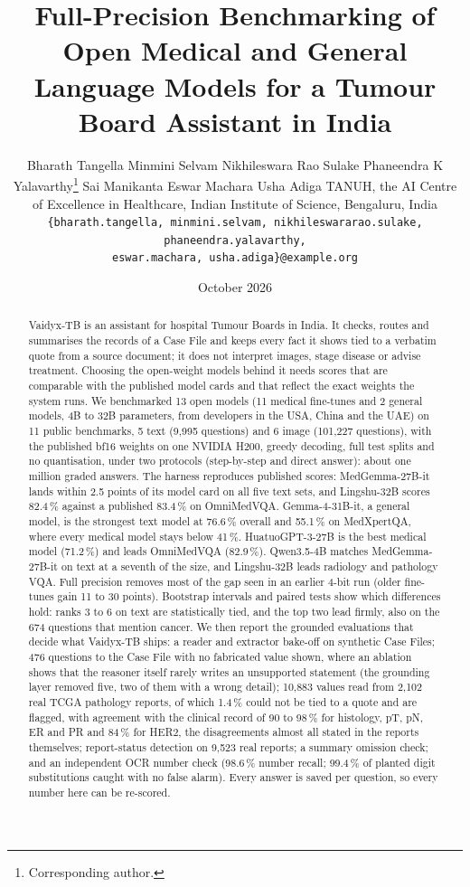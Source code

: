 \documentclass{article}
\title{Full-Precision Benchmarking of Open Medical and General Language Models for a Tumour Board Assistant in India}
\author{%
  Bharath Tangella \And Minmini Selvam \And Nikhileswara Rao Sulake
  \AND Phaneendra K Yalavarthy\thanks{Corresponding author.} \And Sai Manikanta Eswar Machara \And Usha Adiga
  \AND \normalfont TANUH, the AI Centre of Excellence in Healthcare, Indian Institute of Science, Bengaluru, India\\
  \texttt{\{bharath.tangella, minmini.selvam, nikhileswararao.sulake, phaneendra.yalavarthy,}\\
  \texttt{eswar.machara, usha.adiga\}@example.org}
}
\date{October 2026}
\newcommand{\pct}{\,\%}
\begin{document}
\maketitle

\begin{abstract}
Vaidyx-TB is an assistant for hospital Tumour Boards in India. It checks, routes and summarises the records of a Case File and keeps every fact it shows tied to a verbatim quote from a source document; it does not interpret images, stage disease or advise treatment. Choosing the open-weight models behind it needs scores that are comparable with the published model cards and that reflect the exact weights the system runs. We benchmarked 13 open models (11 medical fine-tunes and 2 general models, 4B to 32B parameters, from developers in the USA, China and the UAE) on 11 public benchmarks, 5 text (9,995 questions) and 6 image (101,227 questions), with the published bf16 weights on one NVIDIA H200, greedy decoding, full test splits and no quantisation, under two protocols (step-by-step and direct answer): about one million graded answers. The harness reproduces published scores: MedGemma-27B-it lands within 2.5 points of its model card on all five text sets, and Lingshu-32B scores 82.4\pct{} against a published 83.4\pct{} on OmniMedVQA. Gemma-4-31B-it, a general model, is the strongest text model at 76.6\pct{} overall and 55.1\pct{} on MedXpertQA, where every medical model stays below 41\pct{}. HuatuoGPT-3-27B is the best medical model (71.2\pct{}) and leads OmniMedVQA (82.9\pct{}). Qwen3.5-4B matches MedGemma-27B-it on text at a seventh of the size, and Lingshu-32B leads radiology and pathology VQA. Full precision removes most of the gap seen in an earlier 4-bit run (older fine-tunes gain 11 to 30 points). Bootstrap intervals and paired tests show which differences hold: ranks 3 to 6 on text are statistically tied, and the top two lead firmly, also on the 674 questions that mention cancer. We then report the grounded evaluations that decide what Vaidyx-TB ships: a reader and extractor bake-off on synthetic Case Files; 476 questions to the Case File with no fabricated value shown, where an ablation shows that the reasoner itself rarely writes an unsupported statement (the grounding layer removed five, two of them with a wrong detail); 10,883 values read from 2,102 real TCGA pathology reports, of which 1.4\pct{} could not be tied to a quote and are flagged, with agreement with the clinical record of 90 to 98\pct{} for histology, pT, pN, ER and PR and 84\pct{} for HER2, the disagreements almost all stated in the reports themselves; report-status detection on 9,523 real reports; a summary omission check; and an independent OCR number check (98.6\pct{} number recall; 99.4\pct{} of planted digit substitutions caught with no false alarm). Every answer is saved per question, so every number here can be re-scored.
\end{abstract}
\end{document}
